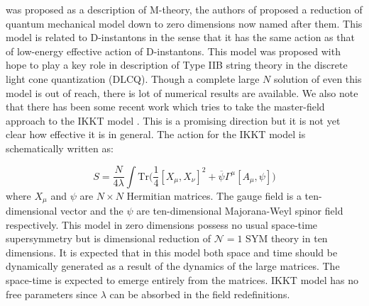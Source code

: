 \documentclass[11pt]{article}
\begin{document}
was proposed as a description of M-theory, the authors of 
\cite{Ishibashi:1996xs} proposed a reduction of quantum mechanical model down to zero 
dimensions now named after them. This model is related to D-instantons 
in the sense that it has the same action as that of low-energy effective action of D-instantons. 
This model was proposed with hope to play a key role in description of Type IIB string theory in 
the discrete light cone quantization (DLCQ). Though a complete large $N$ solution of even this model 
is out of reach, there is lot of numerical results are available. 
We also note that there has been some recent work which tries to take the master-field approach to the
IKKT model \cite{Klinkhamer:2021wrv}. This is a promising direction but it is not yet clear how effective 
it is in general. The action for the IKKT model is schematically written as:

\begin{equation}
	\label{eq:IKKT} 
S = \frac{N}{4\lambda} \int \mbox{Tr} \Big( \frac{1}{4} [X_\mu, X_\nu]^{2} + \overline{\psi} \Gamma^{\mu} [A_{\mu},\psi] \Big) 
\end{equation}
where $X_{\mu}$ and $\psi$ are $N \times N$ Hermitian matrices. The gauge field is a ten-dimensional vector and the $\psi$ are ten-dimensional Majorana-Weyl spinor field respectively. This model in zero dimensions possess no usual space-time supersymmetry 
but is dimensional reduction of $\mathcal{N}=1$ SYM theory in ten dimensions. 
It is expected that in this model both space and time should be dynamically generated as a result of the dynamics of the large matrices. 
The space-time is expected to emerge entirely from the matrices. 
IKKT model has no free parameters since $\lambda$ can be absorbed in the 
field redefinitions. 
\end{document}
